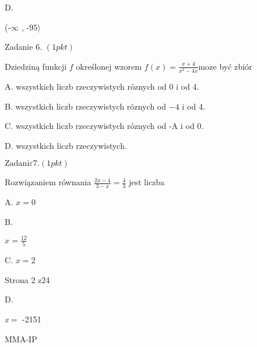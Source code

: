 \documentclass[a4paper,12pt]{article}
\begin{document}
D.

(-$\infty$ , -95$\rangle$

Zadanie 6. $(1pkt)$

Dziedziną funkcji $f$ określonej wzorem $f(x)=\displaystyle \frac{x+4}{x^{2}-4x}\mathrm{m}\mathrm{o}\dot{\mathrm{z}}\mathrm{e}$ być zbiór

A. wszystkich liczb rzeczywistych róznych od 0 i od 4.

B. wszystkich liczb rzeczywistych róznych od $-4$ i od 4.

C. wszystkich liczb rzeczywistych róznych od -A i od 0.

D. wszystkich liczb rzeczywistych.

$\mathrm{Z}\mathrm{a}\mathrm{d}\mathrm{a}\mathrm{n}\mathrm{i}\varepsilon 7. (1pkt)$

Rozwiązaniem równania $\displaystyle \frac{2x-4}{3-x}=\frac{4}{3}$ jest liczba

A. $x=0$

B.

$x=\displaystyle \frac{12}{5}$

C. $x=2$

Strona 2 z24

D.

{\it x}$=$ -2151

MMA-IP
\end{document}
